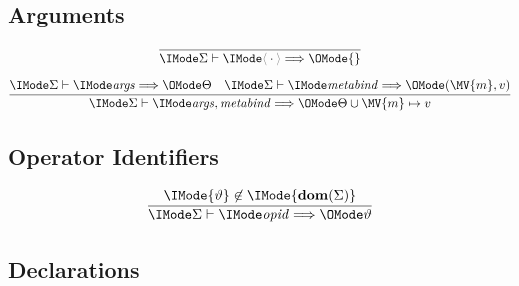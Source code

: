 \subsection*{Arguments\hfill \framebox{$\Elab{\Sigma}{\SortArgs}{\Theta}$}}

\begin{gather}
  \infer{
    \Elab{\Sigma}{\ProdEmptyCtx}{\{\}}
  }{
  }\\[6pt]
  \infer{
    \Elab{\Sigma}{\ProdExtendCtx{\SortArgs}{\SortMetaBind}}{
      \Theta\cup{\MV{m} \mapsto v}
    }
  }{
    \Elab{\Sigma}{\SortArgs}{\Theta} &
    \Elab{\Sigma}{\SortMetaBind}{(\MV{m}, v)}
  }
\end{gather}

\subsection*{Operator Identifiers\hfill \framebox{$\Elab{\Sigma}{\SortOpId}{\vartheta}$}}

\begin{gather}
  \infer{
    \Elab{\Sigma}{\SortOpId}{\vartheta}
  }{
    \IMode{\vartheta}\not\in\IMode{\mathbf{dom}(\Sigma)}
  }
\end{gather}

\subsection*{Declarations\hfill {}}

